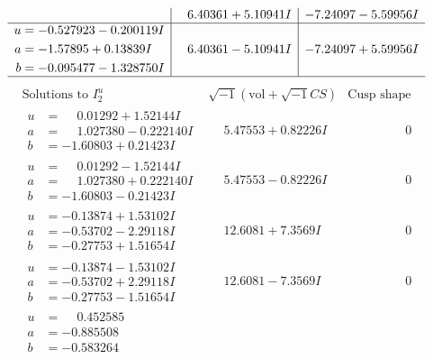 \documentclass[1p]{elsarticle_modified}
\theoremstyle{definition}
\newcommand{\I}{\sqrt{-1}}
\begin{document}
$$\begin{array}{c|c|c}
 & \phantom{-}6.40361 + 5.10941 I & -7.24097 - 5.59956 I \\ \hline\begin{aligned}
u &= -0.527923 - 0.200119 I \\
a &= -1.57895 + 0.13839 I \\
b &= -0.095477 - 1.328750 I\end{aligned}
 & \phantom{-}6.40361 - 5.10941 I & -7.24097 + 5.59956 I\\
 \hline 
 \end{array}$$\newpage$$\begin{array}{c|c|c}  
\text{Solutions to }I^u_{2}& \I (\text{vol} + \sqrt{-1}CS) & \text{Cusp shape}\\
 \hline 
\begin{aligned}
u &= \phantom{-}0.01292 + 1.52144 I \\
a &= \phantom{-}1.027380 - 0.222140 I \\
b &= -1.60803 + 0.21423 I\end{aligned}
 & \phantom{-}5.47553 + 0.82226 I & \phantom{-0.000000 } 0 \\ \hline\begin{aligned}
u &= \phantom{-}0.01292 - 1.52144 I \\
a &= \phantom{-}1.027380 + 0.222140 I \\
b &= -1.60803 - 0.21423 I\end{aligned}
 & \phantom{-}5.47553 - 0.82226 I & \phantom{-0.000000 } 0 \\ \hline\begin{aligned}
u &= -0.13874 + 1.53102 I \\
a &= -0.53702 - 2.29118 I \\
b &= -0.27753 + 1.51654 I\end{aligned}
 & \phantom{-}12.6081 + 7.3569 I & \phantom{-0.000000 } 0 \\ \hline\begin{aligned}
u &= -0.13874 - 1.53102 I \\
a &= -0.53702 + 2.29118 I \\
b &= -0.27753 - 1.51654 I\end{aligned}
 & \phantom{-}12.6081 - 7.3569 I & \phantom{-0.000000 } 0 \\ \hline\begin{aligned}
u &= \phantom{-}0.452585\phantom{ +0.000000I} \\
a &= -0.885508\phantom{ +0.000000I} \\
b &= -0.583264\phantom{ +0.000000I}\end{aligned}

\end{array}$$
\end{document}
